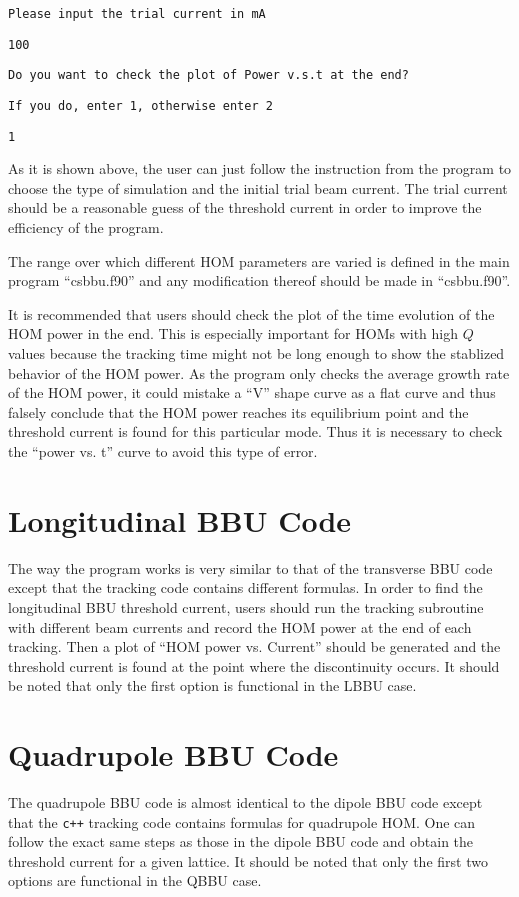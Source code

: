 \documentclass[12pt]{article}
\begin{document}
\texttt{Please input the trial current in mA}

\texttt{100}

\texttt{Do you want to check the plot of Power v.s.t at the end?}

\texttt{If you do, enter 1, otherwise enter 2}

\texttt{1}

As it is shown above, the user can just follow the instruction from
the program to choose the type of simulation and the initial trial
beam current. The trial current should be a reasonable guess
of the threshold current in order to improve the efficiency of
the program.

The range over which different HOM parameters are varied is 
defined in the main program ``csbbu.f90'' and any modification thereof
should be made in ``csbbu.f90''. 

It is recommended that users should check the plot of the time evolution
of the HOM power in the end. This is especially important for HOMs with
high $Q$ values because the tracking time might not be long enough to show
the stablized behavior of the HOM power. As the program only checks the
average growth rate of the HOM power, it could mistake a ``V'' shape curve
as a flat curve and thus falsely conclude that the HOM power reaches its 
equilibrium point and the threshold current is found for this particular mode.
Thus it is necessary to check the ``power vs. t'' curve to avoid this
type of error.
 
\section{Longitudinal BBU Code}

The way the program works is very similar to that of the transverse BBU code
except that the tracking code contains different formulas. In order to find
the longitudinal BBU threshold current, users should run the tracking 
subroutine with different beam currents and record the HOM power at the
end of each tracking. Then a plot of ``HOM power vs. Current'' should
be generated and the threshold current is found at the point where
the discontinuity occurs. It should be noted that only the first option
is functional in the LBBU case.

\section{Quadrupole BBU Code}

The quadrupole BBU code is almost identical to the dipole BBU code except
that the \texttt{c++} tracking code contains formulas for quadrupole HOM.
One can follow the exact same steps as those in the dipole BBU code and
obtain the threshold current for a given lattice. It should be noted that 
only the first two options are functional in the QBBU case.
\end{document}
